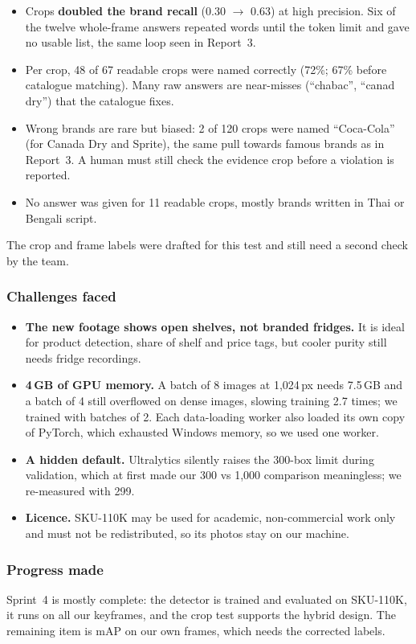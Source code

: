 \begin{itemize}
  \item Crops \textbf{doubled the brand recall} (0.30 $\rightarrow$ 0.63) at high precision. Six of
  the twelve whole-frame answers repeated words until the token limit and gave no usable list,
  the same loop seen in Report~3.
  \item Per crop, 48 of 67 readable crops were named correctly (72\%; 67\% before catalogue
  matching). Many raw answers are near-misses (``chabac'', ``canad dry'') that the catalogue fixes.
  \item Wrong brands are rare but biased: 2 of 120 crops were named ``Coca-Cola'' (for Canada Dry
  and Sprite), the same pull towards famous brands as in Report~3. A human must still check the
  evidence crop before a violation is reported.
  \item No answer was given for 11 readable crops, mostly brands written in Thai or Bengali script.
\end{itemize}
The crop and frame labels were drafted for this test and still need a second check by the team.

\subsubsection{Challenges faced}
\begin{itemize}
  \item \textbf{The new footage shows open shelves, not branded fridges.} It is ideal for product
  detection, share of shelf and price tags, but cooler purity still needs fridge recordings.
  \item \textbf{4\,GB of GPU memory.} A batch of 8 images at 1{,}024\,px needs 7.5\,GB and a batch of
  4 still overflowed on dense images, slowing training 2.7 times; we trained with batches of 2.
  Each data-loading worker also loaded its own copy of PyTorch, which exhausted Windows memory,
  so we used one worker.
  \item \textbf{A hidden default.} Ultralytics silently raises the 300-box limit during validation,
  which at first made our 300 vs 1{,}000 comparison meaningless; we re-measured with 299.
  \item \textbf{Licence.} SKU-110K may be used for academic, non-commercial work only and must not
  be redistributed, so its photos stay on our machine.
\end{itemize}

\subsubsection{Progress made}
Sprint~4 is mostly complete: the detector is trained and evaluated on SKU-110K, it runs on all our
keyframes, and the crop test supports the hybrid design. The remaining item is mAP on our own
frames, which needs the corrected labels.

